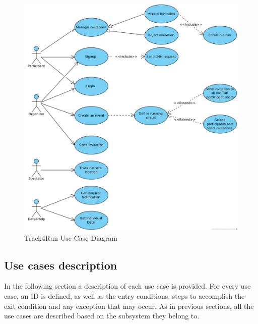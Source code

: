 \documentclass[a4paper, hidelinks, 12pt]{report}
\begin{document}
\begin{itemize}
		
		\begin{figure}[H]
			\centering
			\includegraphics[width=1\textwidth]{Diagrams/t4r_use_cases.png}
			\caption[Track4Run Use Case Diagram]{Track4Run Use Case Diagram}
			\label{fig:t4r_use_cases}
		\end{figure}
	\end{itemize}
	
	\subsection{Use cases description}
	In the following section a description of each use case is provided. For every use case, an ID is defined, as well as the entry conditions, steps to accomplish the exit condition and any exception that may occur. As in previous sections, all the use cases are described based on the subsystem they belong to.
	
\end{document}
